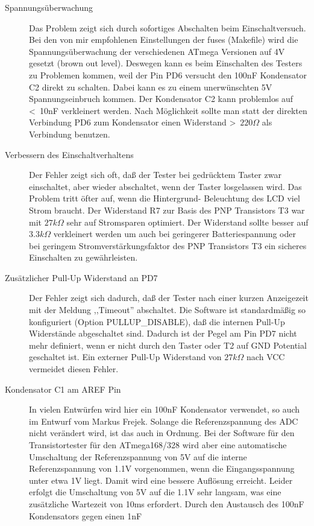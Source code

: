 \begin{description}
\item[Spannungsüberwachung]  
Das Problem zeigt sich durch sofortiges Abschalten beim Einschaltversuch.
Bei den von mir empfohlenen Einstellungen der fuses (Makefile) wird die Spannungsüberwachung der
verschiedenen ATmega Versionen auf 4V gesetzt (brown out level). Deswegen kann es beim
Einschalten des Testers zu Problemen kommen, weil der Pin PD6 versucht den 100nF Kondensator C2
direkt zu schalten. Dabei kann es zu einem unerwünschten 5V Spannungseinbruch kommen.
Der Kondensator C2 kann problemlos auf \textless~10nF verkleinert werden. Nach Möglichkeit sollte
man statt der direkten Verbindung PD6 zum Kondensator einen Widerstand \textgreater~\(220 \Omega\) 
als Verbindung benutzen.
\item[Verbessern des Einschaltverhaltens]
Der Fehler zeigt sich oft, daß der Tester bei gedrücktem Taster zwar einschaltet, aber wieder
abschaltet, wenn der Taster losgelassen wird. Das Problem tritt öfter auf, wenn die Hintergrund-
Beleuchtung des LCD viel Strom braucht.
Der Widerstand R7 zur Basis des PNP Transistors T3 war mit \(27k \Omega\) sehr auf Stromsparen
optimiert. Der Widerstand sollte besser auf \(3.3k \Omega\) verkleinert werden um auch bei
geringerer Batteriespannung oder bei geringem Stromverstärkungsfaktor des PNP Transistors T3
ein sicheres Einschalten zu gewährleisten.
\item[Zusätzlicher Pull-Up Widerstand an PD7]
Der Fehler zeigt sich dadurch, daß der Tester nach einer kurzen Anzeigezeit mit der Meldung
,,Timeout'' abschaltet. Die Software ist standardmäßig so konfiguriert (Option PULLUP\_DISABLE),
daß die internen Pull-Up Widerstände abgeschaltet sind.
Dadurch ist der Pegel am Pin PD7 nicht mehr definiert,
wenn er nicht durch den Taster oder T2 auf GND Potential geschaltet ist. Ein externer
Pull-Up Widerstand von \(27k \Omega\) nach VCC vermeidet diesen Fehler.
\item[Kondensator C1 am AREF Pin]
In vielen Entwürfen wird hier ein 100nF Kondensator verwendet, so auch im Entwurf vom Markus Frejek.
Solange die Referenzspannung des ADC nicht verändert wird, ist das auch in Ordnung.
Bei der Software für den Transistortester für den ATmega168/328 wird aber eine automatische
Umschaltung der Referenzspannung von 5V auf die interne Referenzspannung von 1.1V vorgenommen,
wenn die Eingangsspannung unter etwa 1V liegt. Damit wird eine bessere Auflösung erreicht.
Leider erfolgt die Umschaltung von 5V auf die 1.1V sehr langsam, was eine zusätzliche
Wartezeit von 10ms erfordert. Durch den Austausch des 100nF Kondensators gegen einen 1nF

\end{description}
